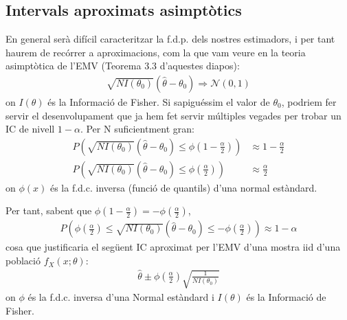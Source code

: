 \documentclass[letterpaper,10pt,english]{sphinxmanual}
\begin{document}
\subsection{Intervals aproximats asimptòtics}
\label{\detokenize{0_Intro/0_3_Estimacio:intervals-aproximats-asimptotics}}
En general serà difícil caracteritzar la f.d.p. dels nostres estimadors, i
per tant haurem de recórrer a aproximacions, com la que vam veure
en la teoria asimptòtica de l’EMV (Teorema 3.3 d’aquestes diapos):
\begin{equation*}
\begin{split}\sqrt{N {I}(\theta_0)}(\hat{\theta} - \theta_0) \Rightarrow \mathcal{N}(0, 1)\end{split}
\end{equation*}
on \(I(\theta)\) és
la Informació de Fisher. Si sapiguéssim el valor de \(\theta_0\), podriem fer
servir el desenvolupament que ja hem fet servir múltiples vegades
per trobar un IC de nivell \(1  - \alpha\). Per N suficientment gran:
\begin{equation*}
\begin{split}P\left(\sqrt{N {I}(\theta_0)}(\hat{\theta} - \theta_0) \leq \phi\left(1 - \frac{\alpha}{2}\right)\right) &\approx 1 - \frac{\alpha}{2} \\
P\left(\sqrt{N {I}(\theta_0)}(\hat{\theta} - \theta_0) \leq \phi\left(\frac{\alpha}{2}\right)\right) & \approx \frac{\alpha}{2}\end{split}
\end{equation*}
on \(\phi(x)\) és la f.d.c. inversa (funció de quantils) d’una normal estàndard.

Per tant, sabent que \(\phi\left(1 - \frac{\alpha}{2}\right)= -  \phi\left(\frac{\alpha}{2}\right)\),
\begin{equation*}
\begin{split}P\left( \phi\left(\frac{\alpha}{2}\right) \leq \sqrt{N {I}(\theta_0)}(\hat{\theta} - \theta_0) \leq -\phi\left(\frac{\alpha}{2}\right)\right) \approx 1 - \alpha\end{split}
\end{equation*}
cosa que justificaria el següent IC aproximat per l’EMV d’una mostra iid d’una
població \(f_X(x;\theta)\):
\begin{equation*}
\begin{split}\hat{\theta} \pm \phi\left(\frac{\alpha}{2}\right) \sqrt{\frac{1}{N I(\theta_0)}}\end{split}
\end{equation*}
on \(\phi\) és la f.d.c. inversa d’una Normal estàndard i \(I(\theta)\) és
la Informació de Fisher.
\end{document}
